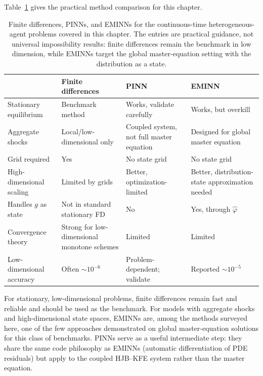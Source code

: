 \documentclass[11pt,a4paper]{report}
\begin{document}
Table~\ref{tab:ct_method_comparison} gives the practical method comparison for this chapter.

\begin{table}[ht]
\centering
\small
\renewcommand{\arraystretch}{1.3}
\begin{tabular}{@{}p{3.0cm}p{3.5cm}p{3.0cm}p{3.0cm}@{}}
\toprule
& \textbf{Finite differences} & \textbf{PINN} & \textbf{EMINN} \\
\midrule
Stationary equilibrium & Benchmark method & Works, validate carefully & Works, but overkill \\
Aggregate shocks & Local/low-dimensional only & Coupled system, not full master equation & Designed for global master equation \\
Grid required & Yes & No state grid & No state grid \\
High-dimensional scaling & Limited by grids & Better, optimization-limited & Better, distribution-state approximation needed \\
Handles $g$ as state & Not in standard stationary FD & No & Yes, through $\hat{\varphi}$ \\
Convergence theory & Strong for low-dimensional monotone schemes & Limited & Limited \\
Low-dimensional accuracy & Often $\sim 10^{-6}$ & Problem-dependent; validate & Reported $\sim 10^{-5}$ \\
\bottomrule
\end{tabular}
\caption{Finite differences, PINNs, and EMINNs for the continuous-time heterogeneous-agent problems covered in this chapter.  The entries are practical guidance, not universal impossibility results: finite differences remain the benchmark in low dimension, while EMINNs target the global master-equation setting with the distribution as a state.}
\label{tab:ct_method_comparison}
\end{table}

For stationary, low-dimensional problems, finite differences remain fast and reliable and should be used as the benchmark.  For models with aggregate shocks and high-dimensional state spaces, EMINNs are, among the methods surveyed here, one of the few approaches demonstrated on global master-equation solutions for this class of benchmarks.  PINNs serve as a useful intermediate step: they share the same code philosophy as EMINNs (automatic differentiation of PDE residuals) but apply to the coupled HJB--KFE system rather than the master equation.
\end{document}
